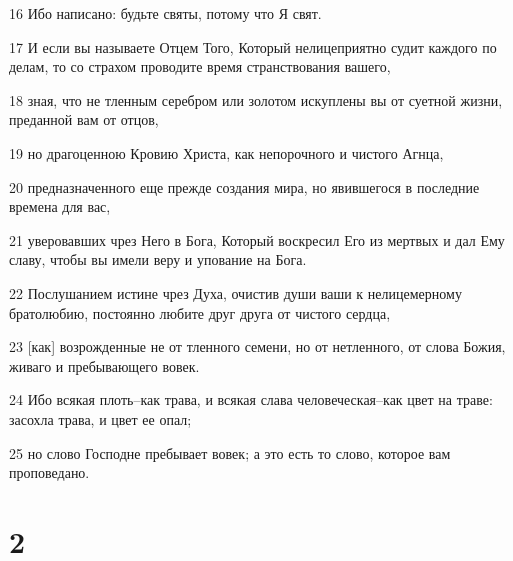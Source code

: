 \par 16 Ибо написано: будьте святы, потому что Я свят.
\par 17 И если вы называете Отцем Того, Который нелицеприятно судит каждого по делам, то со страхом проводите время странствования вашего,
\par 18 зная, что не тленным серебром или золотом искуплены вы от суетной жизни, преданной вам от отцов,
\par 19 но драгоценною Кровию Христа, как непорочного и чистого Агнца,
\par 20 предназначенного еще прежде создания мира, но явившегося в последние времена для вас,
\par 21 уверовавших чрез Него в Бога, Который воскресил Его из мертвых и дал Ему славу, чтобы вы имели веру и упование на Бога.
\par 22 Послушанием истине чрез Духа, очистив души ваши к нелицемерному братолюбию, постоянно любите друг друга от чистого сердца,
\par 23 [как] возрожденные не от тленного семени, но от нетленного, от слова Божия, живаго и пребывающего вовек.
\par 24 Ибо всякая плоть--как трава, и всякая слава человеческая--как цвет на траве: засохла трава, и цвет ее опал;
\par 25 но слово Господне пребывает вовек; а это есть то слово, которое вам проповедано.

\chapter{2}

